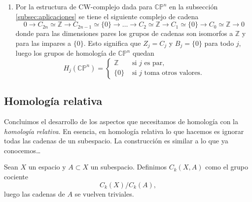 \begin{example}
\begin{enumerate}[label=(\roman*)]
        Y $H_0(T^2)\cong \mathbb{Z}$ por ser conexo por caminos.
        \item Por la estructura de CW-complejo dada para $\mathbb{CP}^n$ en la subsección \ref{subsec:aplicaciones} se tiene el siguiente complejo de cadena
        \begin{equation*}
            0\to C_{2n}\simeq \mathbb{Z} \to C_{2n-1}\simeq \{0\}\to \dots \to C_{2}\simeq \mathbb{Z} \to C_1\simeq \{0\}\to C_0 \simeq \mathbb{Z}\to 0 
        \end{equation*}
        donde para las dimensiones pares los grupos de cadenas son isomorfos a $\mathbb{Z}$ y para las impares a $\{0\}$. Esto significa que $Z_j = C_j$ y $B_j = \{0\}$ para todo $j$, luego los grupos de homología de $\mathbb{CP}^n$ quedan
        \begin{equation*}
            H_j(\mathbb{CP}^n) =
            \begin{cases}
                \mathbb{Z} &\text{ si } j \text{ es par},\\
                \{0\} &\text{ si } j \text{ toma otros valores}.
            \end{cases}
        \end{equation*}
    \end{enumerate}
\end{example}

\bigskip

\subsection{Homología relativa}

Concluimos el desarrollo de los aspectos que necesitamos de homología con la \textit{homología relativa}. En esencia, en homología relativa lo que hacemos es ignorar todas las cadenas de un subespacio. La construcción es similar a lo que ya conocemos\dots

\begin{definition}
    Sean $X$ un espacio y  $A\subset X$ un subespacio. Definimos $C_k(X,A)$ como el grupo cociente
    \begin{equation*}
        C_k(X)/C_k(A),
    \end{equation*} 
    luego las cadenas de $A$ se vuelven triviales.
\end{definition}
 
